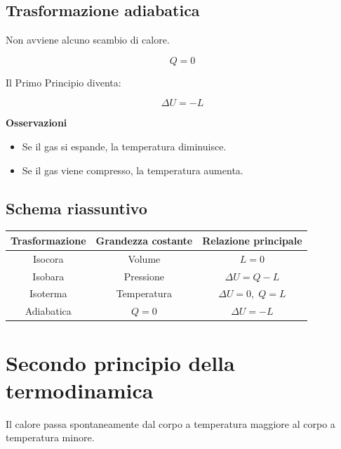 \vspace{0.3cm}

\subsection{Trasformazione adiabatica}

\noindent Non avviene alcuno scambio di calore.

\[
Q=0
\]

\noindent Il Primo Principio diventa:

\[
\Delta U=-L
\]

\vspace{0.3cm}

\noindent\textbf{Osservazioni}

\begin{itemize}
    \item Se il gas si espande, la temperatura diminuisce.
    \item Se il gas viene compresso, la temperatura aumenta.
\end{itemize}

\vspace{0.3cm}

\subsection{Schema riassuntivo}

\begin{center}
\begin{tabular}{|c|c|c|}
\hline
Trasformazione & Grandezza costante & Relazione principale \\
\hline
Isocora & Volume & $L=0$ \\
\hline
Isobara & Pressione & $\Delta U=Q-L$ \\
\hline
Isoterma & Temperatura & $\Delta U=0,\;Q=L$ \\
\hline
Adiabatica & $Q=0$ & $\Delta U=-L$ \\
\hline
\end{tabular}
\end{center}

\vspace{0.3cm}

\section{Secondo principio della termodinamica}

\noindent Il calore passa spontaneamente dal corpo a temperatura maggiore al corpo a temperatura minore.

